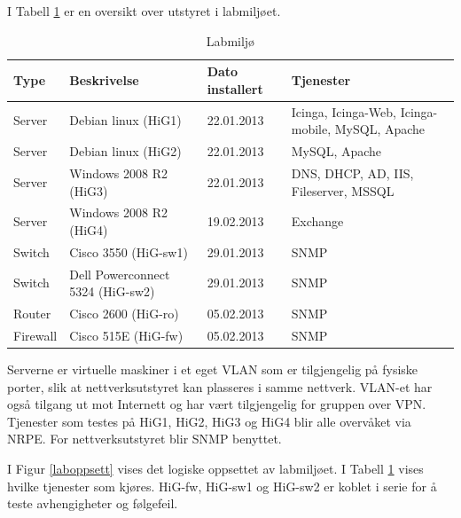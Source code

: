 I Tabell \ref{labmiljo} er en oversikt over utstyret i labmiljøet.
\begin{changemargin}{-1cm}{-1cm}
\begin{table}
\begin{center}
\begin{tabular}{ | l | l | l | p{4cm} |} \hline
	\textbf{Type} & \textbf{Beskrivelse} & \textbf{Dato installert} & \textbf{Tjenester} \\ \hline
	Server & Debian linux (HiG1) & 22.01.2013 & Icinga, Icinga-Web, Icinga-mobile, MySQL, Apache \\ \hline
	Server & Debian linux (HiG2) & 22.01.2013 &	MySQL, Apache \\ \hline
	Server & Windows 2008 R2 (HiG3) & 22.01.2013 & DNS, DHCP, AD, IIS, Fileserver, MSSQL \\ \hline
	Server & Windows 2008 R2 (HiG4) & 19.02.2013 & Exchange \\ \hline 
	Switch & Cisco 3550 (HiG-sw1) &	29.01.2013 & SNMP \\ \hline
	Switch & Dell Powerconnect 5324 (HiG-sw2) & 29.01.2013 & SNMP \\ \hline
	Router & Cisco 2600 (HiG-ro) & 05.02.2013 & SNMP \\ \hline 
	Firewall & Cisco 515E (HiG-fw) & 05.02.2013 & SNMP \\ \hline
\end{tabular}
\caption{Labmiljø}
\label{labmiljo}
\end{center}
\end{table}
\end{changemargin}
Serverne er virtuelle maskiner i et eget VLAN som er tilgjengelig på fysiske porter, slik at nettverksutstyret kan plasseres i samme nettverk. VLAN-et har også tilgang ut mot Internett og har vært tilgjengelig for gruppen over VPN. Tjenester som testes på HiG1, HiG2, HiG3 og HiG4 blir alle overvåket via NRPE. For nettverksutstyret blir SNMP benyttet.

I Figur \ref{laboppsett} vises det logiske oppsettet av labmiljøet. I Tabell \ref{labmiljo} vises hvilke tjenester som kjøres. HiG-fw, HiG-sw1 og HiG-sw2 er koblet i serie for å teste avhengigheter og følgefeil.

